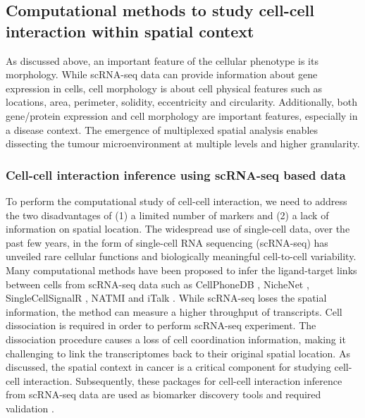\subsection{Computational methods to study cell-cell interaction within spatial context}
\label{Chap1:Sub_Computational} 

As discussed above, an important feature of the cellular phenotype is its morphology. While scRNA-seq data can provide information about gene expression in cells, cell morphology is about cell physical features such as locations, area, perimeter, solidity, eccentricity and circularity. Additionally, both gene/protein expression and cell morphology are important features, especially in a disease context. The emergence of multiplexed spatial analysis enables dissecting the tumour microenvironment at multiple levels and higher granularity. 

\subsubsection{Cell-cell interaction inference using scRNA-seq based data}
To perform the computational study of cell-cell interaction, we need to address the two disadvantages of (1) a limited number of markers and (2) a lack of information on spatial location. The widespread use of single-cell data, over the past few years, in the form of single-cell RNA sequencing (scRNA-seq) has unveiled rare cellular functions and biologically meaningful cell-to-cell variability. Many computational methods have been proposed to infer the ligand-target links between cells  from scRNA-seq data such as CellPhoneDB \cite{efremova2020cellphonedb}, NicheNet \cite{browaeys2020nichenet}, SingleCellSignalR \cite{cabello2020singlecellsignalr}, NATMI \cite{hou2020predicting} and iTalk \cite{wang2019italk}. While scRNA-seq loses the spatial information, the method can measure a higher throughput of transcripts. Cell dissociation is required in order to perform scRNA-seq experiment. The dissociation procedure causes a loss of cell coordination information, making it challenging to link the transcriptomes back to their original spatial location. As discussed, the spatial context in cancer is a critical component for studying cell-cell interaction. Subsequently, these packages for cell-cell interaction inference from scRNA-seq data are used as biomarker discovery tools and required validation \cite{de2020unraveling}. 

